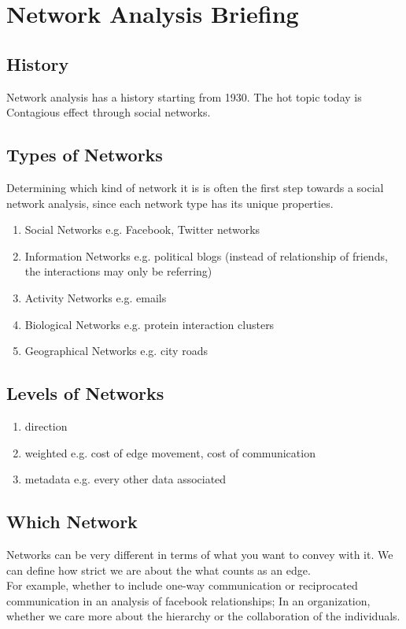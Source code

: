 
\section{Network Analysis Briefing}

\subsection{History}
Network analysis has a history starting from 1930. The hot topic today is Contagious effect through social networks.

\subsection{Types of Networks}
Determining which kind of network it is is often the first step towards a social network analysis, since each network type has its unique properties.
\begin{enumerate}
  \item Social Networks e.g. Facebook, Twitter networks
  \item Information Networks e.g. political blogs (instead of relationship of friends, the interactions may only be referring)
  \item Activity Networks e.g. emails
  \item Biological Networks e.g. protein interaction clusters
  \item Geographical Networks e.g. city roads
\end{enumerate}

\subsection{Levels of Networks}
\begin{enumerate}
  \item direction
  \item weighted e.g. cost of edge movement, cost of communication
  \item metadata e.g. every other data associated
\end{enumerate}

\subsection{Which Network}
Networks can be very different in terms of what you want to convey with it. We can define how strict we are about the what counts as an edge. \\
For example, whether to include one-way communication or reciprocated communication in an analysis of facebook relationships; In an organization, whether we care more about the hierarchy or the collaboration of the individuals.

